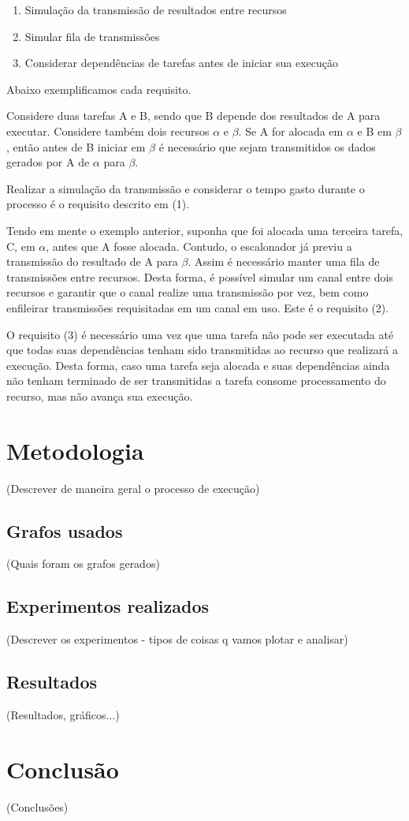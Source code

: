 \documentclass[a4paper,10pt, draft]{article}
\begin{document}
\begin{enumerate}

  \item Simulação da transmissão de resultados entre recursos
  \item Simular fila de transmissões
  \item Considerar dependências de tarefas antes de iniciar sua execução

\end{enumerate}

Abaixo exemplificamos cada requisito.

Considere duas tarefas A e B, sendo que B depende dos resultados de A para executar.
Considere também dois recursos $\alpha$ e $\beta$.
Se A for alocada em $\alpha$ e B em $\beta$, então antes de B iniciar em $\beta$ é necessário
que sejam transmitidos os dados gerados por A de $\alpha$ para $\beta$.

Realizar a simulação da transmissão e considerar o tempo gasto durante o processo é o
requisito descrito em (1).

Tendo em mente o exemplo anterior, suponha que foi alocada uma terceira tarefa, C, em
$\alpha$, antes que A fosse alocada. Contudo, o escalonador já previu a transmissão do
resultado de A para $\beta$. Assim é necessário manter uma fila de transmissões entre
recursos. Desta forma, é possível simular um canal entre dois recursos e garantir que
o canal realize uma transmissão por vez, bem como enfileirar transmissões requisitadas
em um canal em uso. Este é o requisito (2).

O requisito (3) é necessário uma vez que uma tarefa não pode ser executada até que todas
suas dependências tenham sido transmitidas ao recurso que realizará a execução. Desta forma,
caso uma tarefa seja alocada e suas dependências ainda não tenham terminado de ser transmitidas
a tarefa consome processamento do recurso, mas não avança sua execução.

\section{Metodologia}

(Descrever de maneira geral o processo de execução)

\subsection{Grafos usados}

(Quais foram os grafos gerados)

\subsection{Experimentos realizados}

(Descrever os experimentos - tipos de coisas q vamos plotar e analisar)

\subsection{Resultados}

(Resultados, gráficos...)

\section{Conclusão}

(Conclusões)
\end{document}

